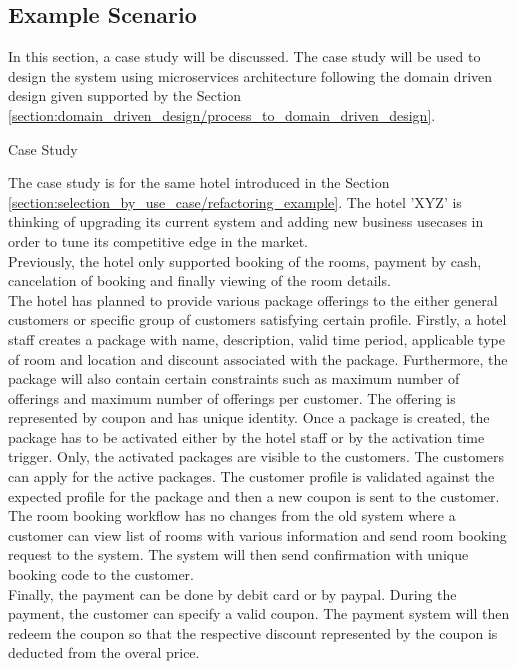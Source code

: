 \subsection{Example Scenario}\label{section:domain_driven_design/example_scenario}
In this section, a case study will be discussed. The case study will be used to design the system using microservices architecture following the domain driven design given supported by the Section \ref{section:domain_driven_design/process_to_domain_driven_design}.

\begin{shaded} Case Study \end{shaded} \label{section:domain_driven_design/example_scenario/case_study}
The case study is for the same hotel introduced in the Section \ref{section:selection_by_use_case/refactoring_example}. The hotel 'XYZ' is thinking of upgrading its current system and adding new business usecases in order to tune its competitive edge in the market.\\
Previously, the hotel only supported booking of the rooms, payment by cash, cancelation of booking and finally viewing of the room details.\\
The hotel has planned to provide various package offerings to the either general customers or specific group of customers satisfying certain profile. Firstly, a hotel staff creates a package with name, description, valid time period, applicable type of room and location and discount associated with the package. Furthermore, the package will also contain certain constraints such as maximum number of offerings and maximum number of offerings per customer. The offering is represented by coupon and has unique identity. Once a package is created, the package has to be activated either by the hotel staff or by the activation time trigger. Only, the activated packages are visible to the customers. The customers can apply for the active packages. The customer profile is validated against the expected profile for the package and then a new coupon is sent to the customer.\\
The room booking workflow has no changes from the old system where a customer can view list of rooms with various information and send room booking request to the system. The system will then send confirmation with unique booking code to the customer.\\
Finally, the payment can be done by debit card or by paypal. During the payment, the customer can specify a valid coupon. The payment system will then redeem the coupon so that the respective discount represented by the coupon is deducted from the overal price.\\
